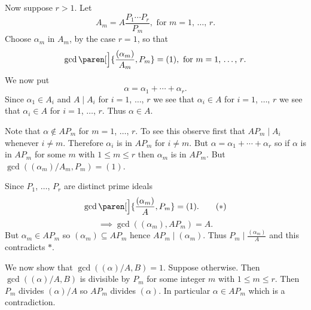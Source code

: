Now suppose $r>1$.  Let
\[ A_m = A\frac{P_1\dotsm P_r}{P_m}, \text{ for $m=1$, $\dotsc$, $r$} . \]
Choose $\alpha_m$ in $A_m$, by the case $r=1$, so that
\[ \gcd\paren[\Big]{\frac{(\alpha_m)}{A_m},P_m} = (1), \text{ for $m=1$, $\dotsc$, $r$} . \]
We now put
\[ \alpha = \alpha_1 + \dotsb + \alpha_r . \]
Since $\alpha_1\in A_i$ and $A\mid A_i$ for $i=1$, $\dotsc$, $r$ we see that $\alpha_i\in A$ for $i=1$, $\dotsc$, $r$ we see that $\alpha_i\in A$ for $i=1$, $\dotsc$, $r$.  Thus $\alpha\in A$.

Note that $\alpha\notin AP_m$ for $m=1$, $\dotsc$, $r$.  To see this observe first that $AP_m\mid A_i$ whenever $i\neq m$.  Therefore $\alpha_i$ is in $AP_m$ for $i\neq m$.  But $\alpha=\alpha_1+\dotsb+\alpha_r$ so if $\alpha$ is in $AP_m$ for some $m$ with $1\leq m\leq r$ then $\alpha_m$ is in $AP_m$.  But $\gcd((\alpha_m)/A_m,P_m)=(1)$.

Since $P_1$, $\dotsc$, $P_r$ are distinct prime ideals
\[ \gcd\paren[\Big]{\frac{(\alpha_m)}{A},P_m} = (1) . \tag{$*$} \]
\[ \implies \gcd((\alpha_m),AP_m) = A . \]
But $\alpha_m\in AP_m$ so $(\alpha_m)\subseteq AP_m$ hence $AP_m\mid(\alpha_m)$.  Thus $P_m\mid\frac{(\alpha_m)}{A}$ and this contradicts $*$.

We now show that $\gcd((\alpha)/A,B)=1$.  Suppose otherwise.  Then $\gcd((\alpha)/A,B)$ is divisible by $P_m$ for some integer $m$ with $1\leq m\leq r$.  Then $P_m$ divides $(\alpha)/A$ so $AP_m$ divides $(\alpha)$.  In particular $\alpha\in AP_m$ which is a contradiction.